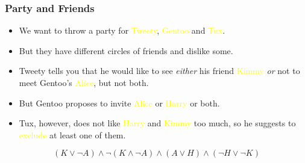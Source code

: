 \documentclass[UTF8,aspectratio=43,11pt,colorlinks,compress,openany]{beamer}%
\begin{document}
\begin{frame}\frametitle{Party and Friends}
	\begin{problem}
		\begin{itemize}
			\item We want to throw a party for \textcolor{yellow}{Tweety}, \textcolor{yellow}{Gentoo} and \textcolor{yellow}{Tux}.
			\item But they have different circles of friends and dislike some.
			\item Tweety tells you that he would like to see \emph{either} his friend \textcolor{yellow}{Kimmy} \emph{or} not to meet Gentoo's \textcolor{yellow}{Alice}, but not both.
			\item But Gentoo proposes to invite \textcolor{yellow}{Alice} or \textcolor{yellow}{Harry} or both.
			\item Tux, however, does not like \textcolor{yellow}{Harry} and \textcolor{yellow}{Kimmy} too much, so he suggests to \textcolor{yellow}{exclude} at least one of them.
		\end{itemize}
	\end{problem}\pause
	\begin{solution}
		\[(K\vee\neg A)\wedge\neg(K\wedge\neg A)\wedge(A\vee H)\wedge(\neg H\vee\neg K)\]
	\end{solution}
\end{frame}
\end{document}
